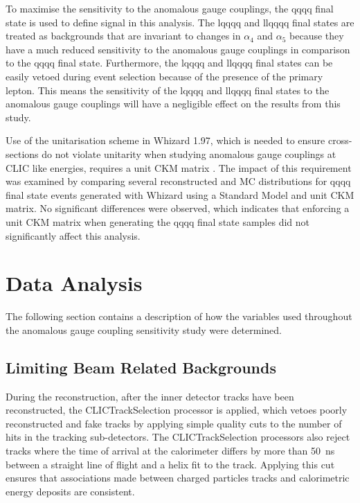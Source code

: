 To maximise the sensitivity to the anomalous gauge couplings, the \nu{\nu}qqqq final state is used to define signal in this analysis.  The {\nu}lqqqq and llqqqq final states are treated as backgrounds that are invariant to changes in $\alpha_{4}$ and $\alpha_{5}$ because they have a much reduced sensitivity to the anomalous gauge couplings in comparison to the \nu{\nu}qqqq final state.  Furthermore, the {\nu}lqqqq and llqqqq final states can be easily vetoed during event selection because of the presence of the primary lepton.  This means the sensitivity of the {\nu}lqqqq and llqqqq final states to the anomalous gauge couplings will have a negligible effect on the results from this study.

Use of the unitarisation scheme in Whizard 1.97, which is needed to ensure cross-sections do not violate unitarity when studying anomalous gauge couplings at CLIC like energies, requires a unit CKM matrix \cite{WhizardManual}.  The impact of this requirement was examined by comparing several reconstructed and MC distributions for \nu{\nu}qqqq final state events generated with Whizard using a Standard Model and unit CKM matrix.  No significant differences were observed, which indicates that enforcing a unit CKM matrix when generating the \nu{\nu}qqqq final state samples did not significantly affect this analysis.  


\section{Data Analysis}
\label{sec:dataanalysis}
The following section contains a description of how the variables used throughout the anomalous gauge coupling sensitivity study were determined.


\subsection{Limiting Beam Related Backgrounds} 
During the reconstruction, after the inner detector tracks have been reconstructed, the CLICTrackSelection processor \cite{arXiv:1209.4039} is applied, which vetoes poorly reconstructed and fake tracks by applying simple quality cuts to the number of hits in the tracking sub-detectors.  The CLICTrackSelection processors also reject tracks where the time of arrival at the calorimeter differs by more than 50~ns between a straight line of flight and a helix fit to the track.  Applying this cut ensures that associations made between charged particles tracks and calorimetric energy deposits are consistent.  


